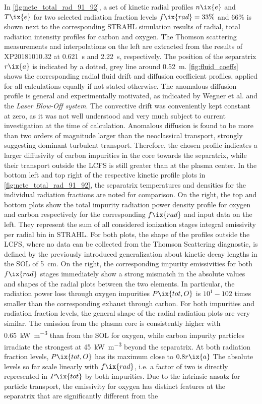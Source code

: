             In \cref{fig:nete_total_rad_91_92}, a set of kinetic radial profiles $n\ix{e}$ and $T\ix{e}$ for two selected radiation fraction levels $f\ix{rad}=33\%$ and $66\%$ is shown next to the corresponding STRAHL simulation results of radial, total radiation intensity profiles for carbon and oxygen. The Thomson scattering measurements and interpolations on the left are extracted from the results of XP20181010.32 at \SI{0.621}{\second} and \SI{2.22}{\second}, respectively. The position of the separatrix $r\ix{a}$ is indicated by a dotted, grey line around \SI{0.52}{\meter}. \autoref{fig:fluid_coeffs} shows the corresponding radial fluid drift and diffusion coefficient profiles, applied for all calculations equally if not stated otherwise. The anomalous diffusion profile is general and experimentally motivated, as indicated by Wegner et al. and the \textit{Laser Blow-Off system}\cite{Klinger2019}. The convective drift was conveniently kept constant at zero, as it was not well understood and very much subject to current investigation at the time of calculation. Anomalous diffusion is found to be more than two orders of magnitude larger than the neoclassical transport, strongly suggesting dominant turbulent transport\cite{Klinger2019}. Therefore, the chosen profile indicates a larger diffusivity of carbon impurities in the core towards the separatrix, while their transport outside the LCFS is still greater than at the plasma center. In the bottom left and top right of the respective kinetic profile plots in \cref{fig:nete_total_rad_91_92}, the separatrix temperatures and densities for the individual radiation fractions are noted for comparison. On the right, the top and bottom plots show the total impurity radiation power density profile for oxygen and carbon respectively for the corresponding $f\ix{rad}$ and input data on the left. They represent the sum of all considered ionization stages integral emissivity per radial bin in STRAHL. For both plots, the shape of the profiles outside the LCFS, where no data can be collected from the Thomson Scattering diagnostic, is defined by the previously introduced generalization about kinetic decay lengths in the SOL of \SI{5}{\centi\meter}. On the right, the corresponding impurity emissivities for both $f\ix{rad}$ stages immediately show a strong mismatch in the absolute values and shapes of the radial plots between the two elements. In particular, the radiation power loss through oxygen impurities $P\ix{tot,O}$ is $10^{1}-10{2}$ times smaller than the corresponding exhaust through carbon. For both impurities and radiation fraction levels, the general shape of the radial radiation plots are very similar. The emission from the plasma core is consistently higher with \SI{0.65}{\kilo\watt\per\cubic\meter} than from the SOL for oxygen, while carbon impurity particles irradiate the strongest at \SI{45}{\kilo\watt\per\cubic\meter} beyond the separatrix. At both radiation fraction levels, $P\ix{tot,O}$ has its maximum close to $0.8r\ix{a}$ The absolute levels so far scale linearly with $f\ix{rad}$, i.e. a factor of two is directly represented in $P\ix{tot}$ by both impurities. Due to the intrinsic ansatz for particle transport, the emissivity for oxygen has distinct features at the separatrix that are significantly different from the 